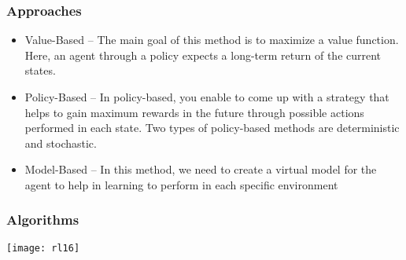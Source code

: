 \begin{frame}[fragile]\frametitle{Approaches}

\begin{itemize}
\item Value-Based – The main goal of this method is to maximize a value function. Here, an agent through a policy expects a long-term return of the current states.

\item Policy-Based – In policy-based, you enable to come up with a strategy that helps to gain maximum rewards in the future through possible actions performed in each state. Two types of policy-based methods are deterministic and stochastic.

\item Model-Based – In this method, we need to create a virtual model for the agent to help in learning to perform in each specific environment
\end{itemize}

\end{frame}

\begin{frame}[fragile]\frametitle{Algorithms}

\begin{center}
\texttt{[image: rl16]}
\end{center}

\end{frame}





